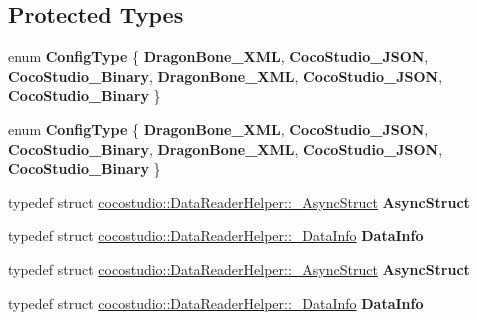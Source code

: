 \subsection*{Protected Types}
\begin{DoxyCompactItemize}
\item 
\mbox{\label{classcocostudio_1_1DataReaderHelper_a12cedd16ce0c4a93d58915e649f3ea57}} 
enum {\bfseries Config\+Type} \{ \newline
{\bfseries Dragon\+Bone\+\_\+\+X\+ML}, 
{\bfseries Coco\+Studio\+\_\+\+J\+S\+ON}, 
{\bfseries Coco\+Studio\+\_\+\+Binary}, 
{\bfseries Dragon\+Bone\+\_\+\+X\+ML}, 
\newline
{\bfseries Coco\+Studio\+\_\+\+J\+S\+ON}, 
{\bfseries Coco\+Studio\+\_\+\+Binary}
 \}
\item 
\mbox{\label{classcocostudio_1_1DataReaderHelper_a12cedd16ce0c4a93d58915e649f3ea57}} 
enum {\bfseries Config\+Type} \{ \newline
{\bfseries Dragon\+Bone\+\_\+\+X\+ML}, 
{\bfseries Coco\+Studio\+\_\+\+J\+S\+ON}, 
{\bfseries Coco\+Studio\+\_\+\+Binary}, 
{\bfseries Dragon\+Bone\+\_\+\+X\+ML}, 
\newline
{\bfseries Coco\+Studio\+\_\+\+J\+S\+ON}, 
{\bfseries Coco\+Studio\+\_\+\+Binary}
 \}
\item 
\mbox{\label{classcocostudio_1_1DataReaderHelper_a6dbfa7729aa1a395f499dcc41cd39c72}} 
typedef struct \hyperlink{structcocostudio_1_1DataReaderHelper_1_1__AsyncStruct}{cocostudio\+::\+Data\+Reader\+Helper\+::\+\_\+\+Async\+Struct} {\bfseries Async\+Struct}
\item 
\mbox{\label{classcocostudio_1_1DataReaderHelper_a63517f8127b73844500855a1ed351d73}} 
typedef struct \hyperlink{structcocostudio_1_1DataReaderHelper_1_1__DataInfo}{cocostudio\+::\+Data\+Reader\+Helper\+::\+\_\+\+Data\+Info} {\bfseries Data\+Info}
\item 
\mbox{\label{classcocostudio_1_1DataReaderHelper_a6dbfa7729aa1a395f499dcc41cd39c72}} 
typedef struct \hyperlink{structcocostudio_1_1DataReaderHelper_1_1__AsyncStruct}{cocostudio\+::\+Data\+Reader\+Helper\+::\+\_\+\+Async\+Struct} {\bfseries Async\+Struct}
\item 
\mbox{\label{classcocostudio_1_1DataReaderHelper_a63517f8127b73844500855a1ed351d73}} 
typedef struct \hyperlink{structcocostudio_1_1DataReaderHelper_1_1__DataInfo}{cocostudio\+::\+Data\+Reader\+Helper\+::\+\_\+\+Data\+Info} {\bfseries Data\+Info}
\end{DoxyCompactItemize}
